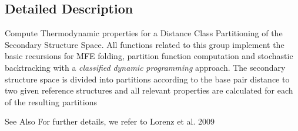 \subsection{Detailed Description}
Compute Thermodynamic properties for a Distance Class Partitioning of the Secondary Structure Space. All functions related to this group implement the basic recursions for M\-F\-E folding, partition function computation and stochastic backtracking with a {\itshape classified} {\itshape dynamic} {\itshape programming} approach. The secondary structure space is divided into partitions according to the base pair distance to two given reference structures and all relevant properties are calculated for each of the resulting partitions \begin{DoxySeeAlso}{See Also}
For further details, we refer to Lorenz et al. 2009 \cite{lorenz:2009} 
\end{DoxySeeAlso}
